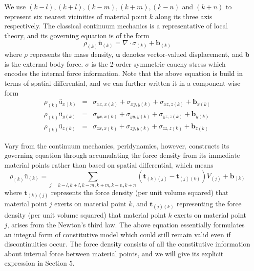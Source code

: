 \documentclass[a4paper,11pt,CJK]{paper}
\newcommand{\tkj}{\textbf{t}_{(k)(j)}}
\newcommand{\tjk}{\textbf{t}_{(j)(k)}}
\begin{document}
We use $(k-l),(k+l),(k-m),(k+m),(k-n)$ and $(k+n)$ to represent six nearest vicinities of material point $k$ along its three axis respectively.
The classical continuum mechanics is a representative of local theory, and its governing equation is of the form
\begin{equation}
\rho_{(k)}\textbf{\"u}_{(k)} = \nabla\cdot\sigma_{(k)} + \textbf{b}_{(k)}
\end{equation}
where $\rho$ represents the mass density, $\textbf{u}$ denotes vector-valued displacement, and $\textbf{b}$ is the external body force.
$\sigma$ is the 2-order symmetric cauchy stress which encodes the internal force information. Note that the above equation is build in terms of spatial differential,
and we can further written it in a component-wise form
\begin{eqnarray}
  \rho_{(k)}\textbf{\"u}_{x(k)} &=& \sigma_{xx,x(k)} + \sigma_{xy,y(k)} + \sigma_{xz,z(k)} + \textbf{b}_{x(k)} \\
  \rho_{(k)}\textbf{\"u}_{y(k)} &=& \sigma_{yx,x(k)} + \sigma_{yy,y(k)} + \sigma_{yz,z(k)} + \textbf{b}_{y(k)} \\
  \rho_{(k)}\textbf{\"u}_{z(k)} &=& \sigma_{zx,x(k)} + \sigma_{zy,y(k)} + \sigma_{zz,z(k)} + \textbf{b}_{z(k)}
\end{eqnarray}

Vary from the continuum mechanics, peridynamics, however, constructs its governing equation through accumulating the force density from its immediate material points 
rather than based on spatial differential, which means
\begin{equation}
\rho_{(k)}\textbf{\"u}_{(k)} = \sum_{j=k-l,k+l,k-m,k+m,k-n,k+n}(\tkj-\tjk)V_{(j)} + \textbf{b}_{(k)}
\end{equation}
where $\tkj$ represents the force density (per unit volume squared) that material point $j$ exerts on material point $k$,
and $\tjk$ representing the force density (per unit volume squared) that material point $k$ exerts on material point $j$, arises from the Newton's third law.
The above equation essentially formulates an integral form of constitutive model which could still remain valid
even if discontinuities occur.
The force density consists of all the constitutive information about internal force between material points,
and we will give its explicit expression in Section 5.
\end{document}
